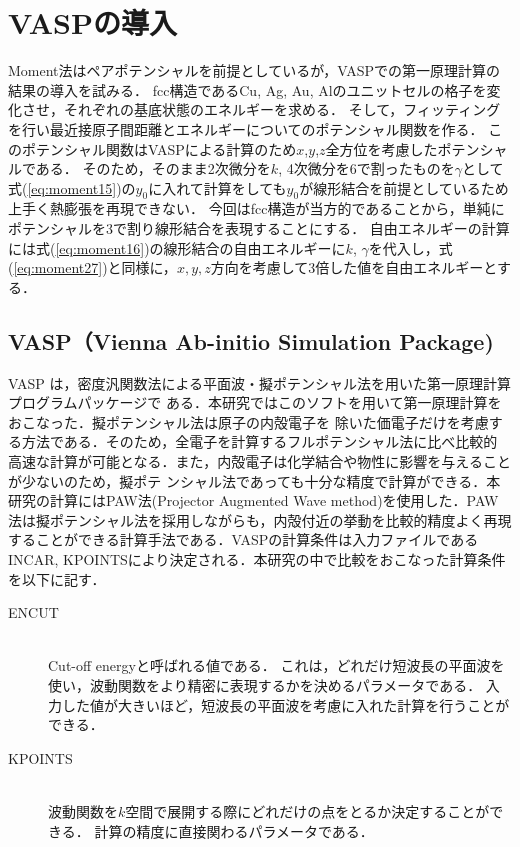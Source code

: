 \section{VASPの導入}
Moment法はペアポテンシャルを前提としているが，VASPでの第一原理計算の結果の導入を試みる．
fcc構造であるCu, Ag, Au, Alのユニットセルの格子を変化させ，それぞれの基底状態のエネルギーを求める．
そして，フィッティングを行い最近接原子間距離とエネルギーについてのポテンシャル関数を作る．
このポテンシャル関数はVASPによる計算のため$x$,$y$,$z$全方位を考慮したポテンシャルである．
そのため，そのまま2次微分を$k$, 4次微分を6で割ったものを$\gamma$として式(\ref{eq:moment15})の$y_0$に入れて計算をしても$y_0$が線形結合を前提としているため上手く熱膨張を再現できない．
今回はfcc構造が当方的であることから，単純にポテンシャルを3で割り線形結合を表現することにする．
自由エネルギーの計算には式(\ref{eq:moment16})の線形結合の自由エネルギーに$k$, $\gamma$を代入し，式(\ref{eq:moment27})と同様に，$x, y, z$方向を考慮して3倍した値を自由エネルギーとする．
\subsection{VASP（Vienna Ab-initio Simulation Package)}
VASP は，密度汎関数法による平面波・擬ポテンシャル法を用いた第一原理計算プログラムパッケージで
ある．本研究ではこのソフトを用いて第一原理計算をおこなった．擬ポテンシャル法は原子の内殻電子を
除いた価電子だけを考慮する方法である．そのため，全電子を計算するフルポテンシャル法に比べ比較的
高速な計算が可能となる．また，内殻電子は化学結合や物性に影響を与えることが少ないのため，擬ポテ
ンシャル法であっても十分な精度で計算ができる．本研究の計算にはPAW法(Projector Augmented Wave method)を使用した．PAW法は擬ポテンシャル法を採用しながらも，内殻付近の挙動を比較的精度よく再現することができる計算手法である．VASPの計算条件は入力ファイルであるINCAR, KPOINTSにより決定される．本研究の中で比較をおこなった計算条件を以下に記す．
\begin{description}
 \item[ENCUT]\mbox{}\\ 
	    Cut-off energyと呼ばれる値である．
	    これは，どれだけ短波長の平面波を使い，波動関数をより精密に表現するかを決めるパラメータである．
	    入力した値が大きいほど，短波長の平面波を考慮に入れた計算を行うことができる．
 \item[KPOINTS]\mbox{}\\
	    波動関数を$k$空間で展開する際にどれだけの点をとるか決定することができる．
	    計算の精度に直接関わるパラメータである．
\end{description}


